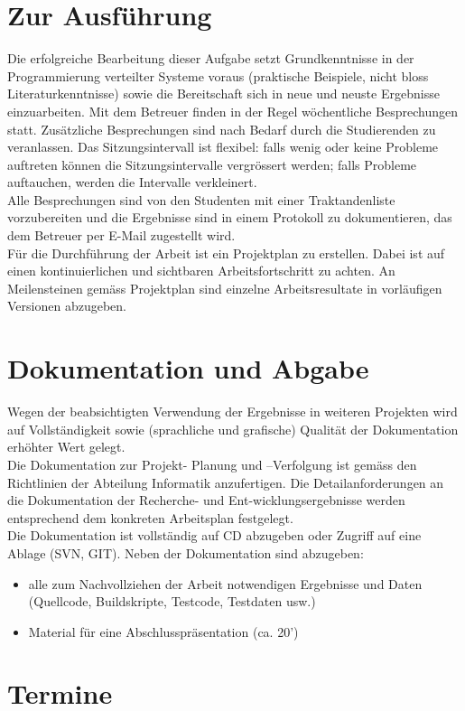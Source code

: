 \documentclass{article}
\begin{document}
\section{Zur Ausführung}
Die erfolgreiche Bearbeitung dieser Aufgabe setzt Grundkenntnisse in der Programmierung verteilter Systeme voraus (praktische Beispiele, nicht bloss Literaturkenntnisse) sowie die Bereitschaft sich in neue und neuste Ergebnisse einzuarbeiten.
Mit dem Betreuer finden in der Regel wöchentliche Besprechungen statt. Zusätzliche Besprechungen sind nach Bedarf durch die Studierenden zu veranlassen. Das Sitzungsintervall ist flexibel: falls wenig oder keine Probleme auftreten können die Sitzungsintervalle vergrössert werden; falls Probleme auftauchen, werden die Intervalle verkleinert.\\
Alle Besprechungen sind von den Studenten mit einer Traktandenliste vorzubereiten und die Ergebnisse sind in einem Protokoll zu dokumentieren, das dem Betreuer per E-Mail zugestellt wird.\\
Für die Durchführung der Arbeit ist ein Projektplan zu erstellen. Dabei ist auf einen kontinuierlichen und sichtbaren Arbeitsfortschritt zu achten. An Meilensteinen gemäss Projektplan sind einzelne Arbeitsresultate in vorläufigen Versionen abzugeben. 
\section{Dokumentation und Abgabe}
Wegen der beabsichtigten Verwendung der Ergebnisse in weiteren Projekten wird auf Vollständigkeit sowie (sprachliche und grafische) Qualität der Dokumentation erhöhter Wert gelegt.\\
Die Dokumentation zur Projekt- Planung und –Verfolgung ist gemäss den Richtlinien der Abteilung Informatik anzufertigen. Die Detailanforderungen an die Dokumentation der Recherche- und Ent-wicklungsergebnisse werden entsprechend dem konkreten Arbeitsplan festgelegt.\\
Die Dokumentation ist vollständig auf CD abzugeben oder Zugriff auf eine Ablage (SVN, GIT).
Neben der Dokumentation sind abzugeben:
\begin{itemize}
\item alle zum Nachvollziehen der Arbeit notwendigen Ergebnisse und Daten (Quellcode, Buildskripte, Testcode, Testdaten usw.)
\item Material für eine Abschlusspräsentation (ca. 20’)
\end{itemize}

\section{Termine}
\end{document}
